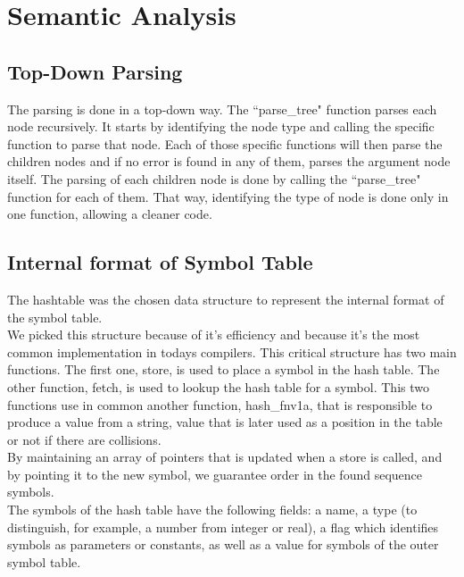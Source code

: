 \documentclass[12pt]{article}
\begin{document}
\newpage

\section{Semantic Analysis}

\subsection{Top-Down Parsing}

The parsing is done in a top-down way. The ``parse\_tree" function parses each node recursively. It starts by identifying the node type and calling the specific function to parse that node. Each of those specific functions will then parse the children nodes and if no error is found in any of them, parses the argument node itself. The parsing of each children node is done by calling the ``parse\_tree" function for each of them. That way, identifying the type of node is done only in one function, allowing a cleaner code.\\

\subsection{Internal format of Symbol Table}

The hashtable was the chosen data structure to represent the internal format of the symbol table. \\
We picked this structure because of it's efficiency and because it's the most common implementation in todays compilers. This critical structure has two main functions. The first one, store, is used to place a symbol in the hash table. The other function, fetch, is used to lookup the hash table for a symbol. This two functions use in common another function, hash\_fnv1a, that is responsible to produce a value from a string, value that is later used as a position in the table or not if there are collisions. \\
By maintaining an array of pointers that is updated when a store is called, and by pointing it to the new symbol, we guarantee order in the found sequence symbols. \\
The symbols of the hash table have the following fields: a name, a type (to distinguish, for example, a number from integer or real), a flag which identifies symbols as parameters or constants, as well as a value for symbols of the outer symbol table. \\
\end{document}
